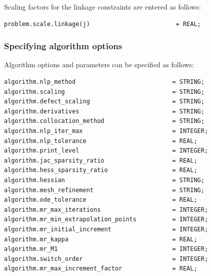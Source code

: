 \documentclass[a4paper,11pt]{report}    %
\begin{document}
Scaling factors for the linkage constraints are entered as follows:

\begin{verbatim}
problem.scale.linkage(j)                        = REAL;
\end{verbatim}

\subsubsection{Specifying algorithm options}

Algorithm options and parameters can be specified as follows:

\begin{verbatim}
algorithm.nlp_method                           = STRING; 
algorithm.scaling                              = STRING; 
algorithm.defect_scaling                       = STRING;
algorithm.derivatives                          = STRING;
algorithm.collocation_method                   = STRING; 
algorithm.nlp_iter_max                         = INTEGER;
algorithm.nlp_tolerance                        = REAL;
algorithm.print_level                          = INTEGER;
algorithm.jac_sparsity_ratio                   = REAL;
algorithm.hess_sparsity_ratio                  = REAL;
algorithm.hessian                              = STRING;
algorithm.mesh_refinement                      = STRING;
algorithm.ode_tolerance                        = REAL;
algorithm.mr_max_iterations                    = INTEGER;
algorithm.mr_min_extrapolation_points          = INTEGER;
algorithm.mr_initial_increment                 = INTEGER;
algorithm.mr_kappa                             = REAL;
algorithm.mr_M1                                = INTEGER;
algorithm.switch_order                         = INTEGER;
algorithm.mr_max_increment_factor              = REAL;
\end{verbatim}
\end{document}
